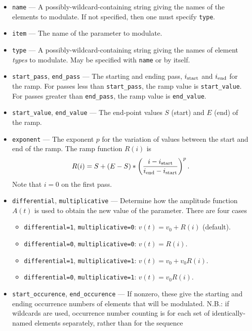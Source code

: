 \documentclass[11pt]{article}
\begin{document}
\begin{itemize}
\item \verb|name| --- A possibly-wildcard-containing string giving the names of the
        elements to modulate. If not specified, then one must specify \verb|type|.
\item \verb|item| --- The name of the parameter to modulate.
\item \verb|type| --- A possibly-wildcard-containing string giving the names of element
        {\em types} to modulate.  May be specified with \verb|name| or by itself.
\item \verb|start_pass|, \verb|end_pass| --- The starting and ending pass, 
  $i_{\rm start}$ and $i_{\rm end}$ for the ramp.
 For passes less than \verb|start_pass|, the ramp value is \verb|start_value|.
 For passes greater than \verb|end_pass|, the ramp value is \verb|end_value|.
\item \verb|start_value|, \verb|end_value| --- The end-point values $S$ (start) and $E$ (end) of the ramp.
\item \verb|exponent| --- The exponent $p$ for the variation of values between the start and end
  of the ramp.  The ramp function $R(i)$ is 
\begin{equation}
  R(i) = S + (E-S)*\left(\frac{i-i_{\rm start}}{i_{\rm end}-i_{\rm start}}\right)^p.
\end{equation}
Note that $i=0$ on the first pass.
\item \verb|differential|, \verb|multiplicative| --- Determine how the amplitude function
  $A(t)$ is used to obtain the new value of the parameter.  There are four cases
  \begin{itemize}
    \item \verb|differential=1|, \verb|multiplicative=0|: $v(t) = v_0 + R(i)$ (default).
    \item \verb|differential=0|, \verb|multiplicative=0|: $v(t) = R(i)$.  
    \item \verb|differential=1|, \verb|multiplicative=1|: $v(t) = v_0 + v_0 R(i)$.  
    \item \verb|differential=0|, \verb|multiplicative=1|: $v(t) = v_0 R(i)$.  
  \end{itemize}
\item \verb|start_occurence|, \verb|end_occurence| --- If nonzero, these give the starting and
 ending occurrence numbers of elements that will be modulated. N.B.: if wildcards are used, occurrence
 number counting is for each set of identically-named elements separately, rather than for the sequence

\end{itemize}
\end{document}
